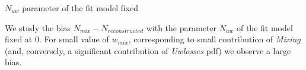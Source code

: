 \documentclass[9pt]{beamer}
\newcommand{\nologo}{\setbeamertemplate{logo}{}}
\begin{document}
{\nologo
\begin{frame}{$N_{uw}$ parameter of the fit model fixed}

We study the bias $N_{mix} - N_{reconstructed}$ with the parameter $N_{uw}$ of the fit model fixed at $0$. For small value of $w_{mix}$, corresponding to small contribution of \textit{Mixing}  (and, conversely, a significant contribution of \textit{Uwlosses} pdf) we observe a large bias.

\begin{figure}
\end{figure}
\end{frame}
}
\end{document}
